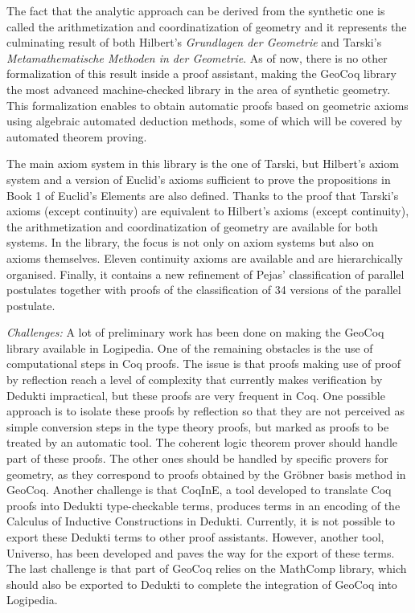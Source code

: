 The fact that the analytic approach can be derived from the synthetic
one is called the arithmetization and coordinatization of geometry and
it represents the culminating result of both Hilbert's {\em Grundlagen der
Geometrie} and Tarski's {\em Metamathematische Methoden in der
Geometrie}. As of now, there is no other formalization of this result
inside a proof assistant, making the GeoCoq library the most advanced
machine-checked library in the area of synthetic geometry. This
formalization enables to obtain automatic proofs based on geometric
axioms using algebraic automated deduction methods, some of which will
be covered by automated theorem proving.

The main axiom system in this library is the one of Tarski, but
Hilbert's axiom system and a version of Euclid's axioms sufficient to
prove the propositions in Book 1 of Euclid's Elements are also
defined. Thanks to the proof that Tarski's axioms (except continuity)
are equivalent to Hilbert's axioms (except continuity), the
arithmetization and coordinatization of geometry are available for
both systems. In the library, the focus is not only on axiom systems
but also on axioms themselves. Eleven continuity axioms are available
and are hierarchically organised. Finally, it contains a new
refinement of Pejas' classification of parallel postulates together
with proofs of the classification of 34 versions of the parallel
postulate.

\emph{Challenges:} A lot of preliminary work has been done on making the
GeoCoq library available in Logipedia.  One of the remaining obstacles is the use of
computational steps in Coq proofs. The issue is that proofs making use of
proof by reflection reach a level of complexity that currently makes
verification by Dedukti impractical, but these proofs are very
frequent in Coq.  One possible approach is to isolate these proofs by
reflection so that they are not perceived as simple conversion steps
in the type theory proofs, but marked as proofs to be treated by an
automatic tool. The coherent logic theorem prover should handle part
of these proofs. The other ones should be handled by specific provers
for geometry, as they correspond to proofs obtained by the Gr\"obner
basis method in GeoCoq.  Another challenge is that CoqInE, a tool
developed to translate Coq proofs into Dedukti type-checkable terms,
produces terms in an encoding of the Calculus of Inductive
Constructions in Dedukti. Currently, it is not possible to export these
Dedukti terms to other proof assistants. However, another tool,
Universo, has been developed and paves the way for the export of these
terms.  The last challenge is that part of GeoCoq relies on the
MathComp library, which should also be exported to Dedukti to complete
the integration of GeoCoq into Logipedia.

